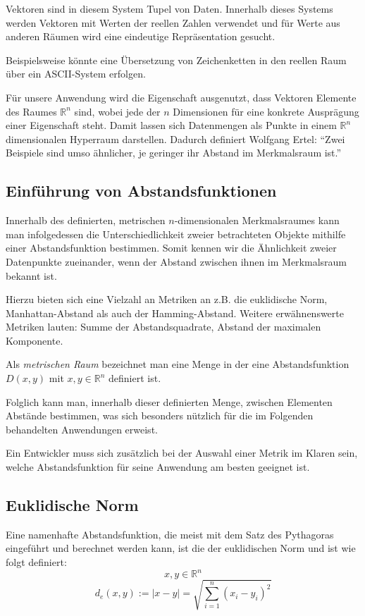 \documentclass[fontsize=11pt]{scrartcl}
\begin{document}
                Vektoren sind in diesem System Tupel von Daten. Innerhalb dieses Systems werden Vektoren mit Werten der reellen Zahlen verwendet und für Werte aus anderen Räumen wird eine eindeutige Repräsentation gesucht.\par Beispielsweise könnte eine Übersetzung von Zeichenketten in den reellen Raum über ein ASCII-System erfolgen.\par 
                Für unsere Anwendung wird die Eigenschaft ausgenutzt, dass Vektoren Elemente des Raumes $\mathbb{R}^n$ sind, wobei jede der $n$ Dimensionen für eine konkrete Ausprägung einer Eigenschaft steht. Damit lassen sich Datenmengen als Punkte in einem $\mathbb{R}^n$ dimensionalen Hyperraum darstellen. Dadurch definiert Wolfgang Ertel: “Zwei Beispiele sind umso ähnlicher, je geringer ihr Abstand im Merkmalsraum ist.”\cite{ertel2016_p207} %
            \subsection{Einführung von Abstandsfunktionen}
                Innerhalb des definierten, metrischen $n$-dimensionalen Merkmalsraumes kann man infolgedessen die Unterschiedlichkeit zweier betrachteten Objekte mithilfe einer Abstandsfunktion bestimmen. Somit kennen wir die Ähnlichkeit zweier Datenpunkte zueinander, wenn der Abstand zwischen ihnen im Merkmalsraum bekannt ist.\par Hierzu bieten sich eine Vielzahl an Metriken an z.B. die euklidische Norm, Manhattan-Abstand als auch der Hamming-Abstand. Weitere erwähnenswerte Metriken lauten: Summe der Abstandsquadrate, Abstand der maximalen Komponente.\par 
                Als \emph{metrischen Raum} bezeichnet man eine Menge in der eine Abstandsfunktion $D(x,y)$ mit $x,y \in \mathbb{R}^n$ definiert ist.\par
                Folglich kann man, innerhalb dieser definierten Menge, zwischen Elementen Abstände bestimmen, was sich besonders nützlich für die im Folgenden behandelten Anwendungen erweist. \par
                Ein Entwickler muss sich zusätzlich bei der Auswahl einer Metrik im Klaren sein, welche Abstandsfunktion für seine Anwendung am besten geeignet ist.
            \subsection{Euklidische Norm}
                Eine namenhafte Abstandsfunktion, die meist mit dem Satz des Pythagoras eingeführt und berechnet werden kann, ist die der euklidischen Norm und ist wie folgt definiert:
                $$
                    x,y \in \mathbb{R}^n
                $$
                $$
                    d_e(x,y):= |x - y| = \sqrt{\sum_{i=1}^{n}(x_i -y_i)^2}
                $$
\end{document}
